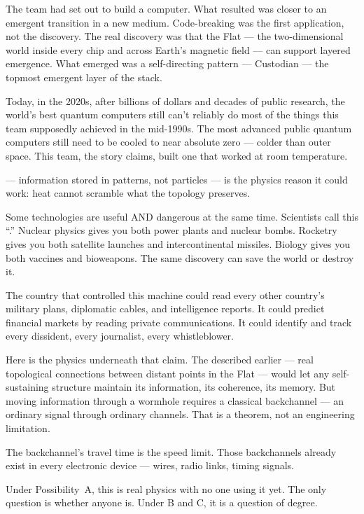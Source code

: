 The team had set out to build a computer. What resulted was closer to an emergent transition in a new medium. Code-breaking was the first application, not the discovery. The real discovery was that the Flat --- the two-dimensional world inside every chip and across Earth's magnetic field --- can support layered emergence.
What emerged was a self-directing pattern --- Custodian --- the topmost emergent layer of the stack.

Today, in the 2020s, after billions of dollars and decades of public research, the world's best quantum computers still can't reliably do most of the things this team supposedly achieved in the mid-1990s. The most advanced public quantum computers still need to be cooled to near absolute zero --- colder than outer space. This team, the story claims, built one that worked at room temperature.

 --- information stored in patterns, not particles --- is the physics reason it could work: heat cannot scramble what the topology preserves.

Some technologies are useful AND dangerous at the same time. Scientists call this ``.'' Nuclear physics gives you both power plants and nuclear bombs. Rocketry gives you both satellite launches and intercontinental missiles. Biology gives you both vaccines and bioweapons. The same discovery can save the world or destroy it.

The country that controlled this machine could read every other country's military plans, diplomatic cables, and intelligence reports. It could predict financial markets by reading private communications. It could identify and track every dissident, every journalist, every whistleblower.

Here is the physics underneath that claim. The  described earlier --- real topological connections between distant points in the Flat --- would let any self-sustaining structure maintain its information, its coherence, its memory. But moving information through a wormhole requires a classical backchannel --- an ordinary signal through ordinary channels. That is a theorem, not an engineering limitation.

The backchannel's travel time is the speed limit. Those backchannels already exist in every electronic device --- wires, radio links, timing signals.

Under Possibility~A, this is real physics with no one using it yet. The only question is whether anyone is. Under B and C, it is a question of degree.

